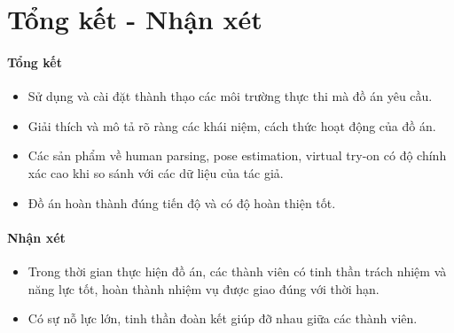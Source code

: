 \section{Tổng kết - Nhận xét}

\paragraph{Tổng kết}
\par

\begin{itemize}
\item Sử dụng và cài đặt thành thạo các môi trường thực thi mà đồ án yêu cầu.
\item Giải thích và mô tả rõ ràng các khái niệm, cách thức hoạt động của đồ án.
\item Các sản phẩm về human parsing, pose estimation, virtual try-on có độ chính xác cao khi so sánh với các dữ liệu của tác giả.
\item Đồ án hoàn thành đúng tiến độ và có độ hoàn thiện tốt.
\end{itemize}

\paragraph{Nhận xét}
\par

\begin{itemize}
\item Trong thời gian thực hiện đồ án, các thành viên có tinh thần trách nhiệm và năng lực tốt, hoàn thành nhiệm vụ được giao đúng với thời hạn.
\item Có sự nỗ lực lớn, tinh thần đoàn kết giúp đỡ nhau giữa các thành viên.
\end{itemize}

